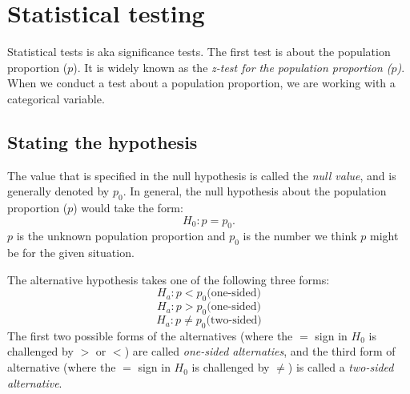 \documentclass[10pt, a4paper]{article}
\begin{document}
\section{Statistical testing}
Statistical tests is aka significance tests. The first test is about the population proportion ($p$). It is widely known as the \emph{z-test for the population proportion ($p$)}. When we conduct a test about a population proportion, we are working with a categorical variable.\par
\subsection{Stating the hypothesis}
The value that is specified in the null hypothesis is called the \emph{null value}, and is generally denoted by $p_0$. In general, the null hypothesis about the population proportion ($p$) would take the form:
\begin{equation}
    H_0: p = p_0.\nonumber
\end{equation}
$p$ is the unknown population proportion and $p_0$ is the number we think $p$ might be for the given situation.\par
The alternative hypothesis takes one of the following three forms:
\[
    H_a: p < p_0 \text{(one-sided)}
\]
\[
    H_a: p > p_0 \text{(one-sided)}
\]
\[
    H_a: p \neq  p_0 \text{(two-sided)}
\]
The first two possible forms of the alternatives (where the $=$ sign in $H_0$ is challenged by $>$ or $<$) are called \emph{one-sided alternaties}, and the third form of alternative (where the $=$ sign in $H_0$ is challenged by $\neq$) is called a \emph{two-sided alternative}.
\end{document}
